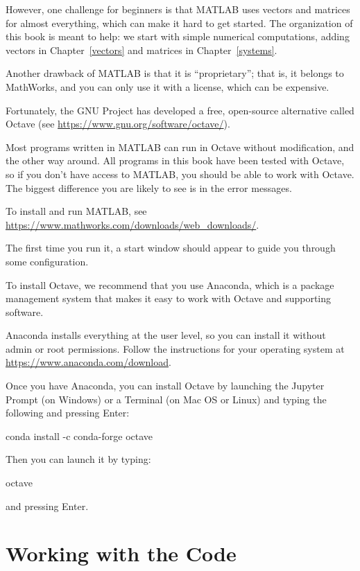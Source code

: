 However, one challenge for beginners is that MATLAB uses vectors and matrices for almost everything, which can make it hard to get started.  The organization of this book is meant to help: we start with simple numerical computations, adding vectors in Chapter~\ref{vectors} and matrices in Chapter~\ref{systems}.

Another drawback of MATLAB is that it is ``proprietary''; that is, it belongs to MathWorks, and you can only use it with a license, which can be expensive.

Fortunately, the GNU Project has developed a free, open-source alternative called Octave (see \url{https://www.gnu.org/software/octave/}).  

Most programs written in MATLAB can run in Octave without modification, and the other way around.  All programs in this book have been tested with Octave, so if you don't have access to MATLAB, you should be able to work with Octave.  The biggest difference you are likely to see is in the error messages.

To install and run MATLAB, see \url{https://www.mathworks.com/downloads/web_downloads/}.

The first time you run it, a start window should appear to guide you through some configuration.

To install Octave, we recommend that you use Anaconda, which is a package management system that makes it easy to work with Octave and supporting software.

Anaconda installs everything at the user level, so you can install it without admin or root permissions.  Follow the instructions for your operating system at \url{https://www.anaconda.com/download}.

Once you have Anaconda, you can install Octave by launching the Jupyter Prompt (on Windows) or a Terminal (on Mac OS or Linux) and typing the following and pressing Enter:

\begin{code}
conda install -c conda-forge octave
\end{code}

Then you can launch it by typing:

\begin{code}
octave
\end{code}

and pressing Enter.

\section{Working with the Code}

